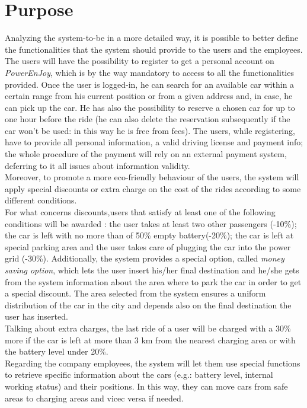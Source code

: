 \documentclass[11pt,a4paper]{report}
\begin{document}
\section{Purpose}
Analyzing the system-to-be in a more detailed way, it is possible to better define the functionalities that the system should provide to the users and the employees.\\
The users will have the possibility to register to get a personal account on \textit{PowerEnJoy}, which is by the way mandatory to access to all the functionalities provided. Once the user is logged-in, he can search for an available car within a certain range from his current position or from a given address and, in case, he can pick up the car. He has also the possibility to reserve a chosen car for up to one hour before the ride (he can also delete the reservation subsequently if the car won't be used: in this way he is free from fees). The users, while registering, have to provide all personal information, a valid driving license and payment info; the whole procedure of the payment will rely on an external payment system, deferring to it all issues about information validity.\\
Moreover, to promote a more eco-friendly behaviour of the users, the system will apply special discounts or extra charge on the cost of the rides according to some different conditions.\\ 
For what concerns discounts,users that satisfy at least one of the following conditions will be awarded : the user takes at least two other passengers (-10\%); the car is 
left with no more than of 50\% empty battery(-20\%); the car is left at special parking area and the user takes care of plugging the car into the power grid (-30\%). Additionally, the system provides a special option, called \textit{money saving option}, which lets the user insert his/her final destination and he/she gets from the system information about the area where to park the car in order to get a special discount. The area selected from the system ensures a uniform distribution of the car in the city and depends also on the final destination the user has inserted.\\
Talking about extra charges, the last ride of a user will be charged with a 30\% more if the car is left at more than 3 km from the nearest charging area or with the battery level under 20\%.\\
Regarding the company employees, the system will let them use special functions to retrieve specific information about the cars (e.g.: battery level, internal working status) and their positions. In this way, they can move cars from safe areas to charging areas and vicec versa if needed.
\end{document}
